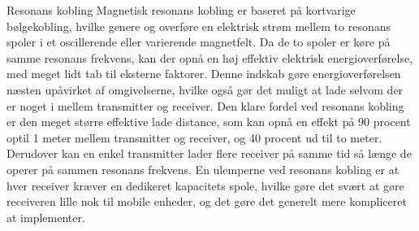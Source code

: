 Resonans kobling 
Magnetisk resonans kobling er baseret på kortvarige bølgekobling, hvilke genere og overføre en elektrisk strøm mellem to resonans spoler i et oscillerende eller varierende magnetfelt. Da de to spoler er køre på samme resonans frekvens, kan der opnå en høj effektiv elektrisk energioverførelse, med meget lidt tab til  eksterne faktorer. Denne indskab gøre energioverførelsen næsten upåvirket af omgivelserne, hvilke også gør det muligt at lade selvom der er noget i mellem transmitter og receiver. 
Den klare fordel ved resonans kobling er den meget større effektive lade distance, som kan opnå en effekt på 90 procent optil 1 meter mellem transmitter og receiver, og 40 procent ud til to meter. Derudover kan en enkel transmitter lader flere receiver på samme tid så længe de operer på sammen resonans frekvens.
En ulemperne ved resonans kobling er at hver receiver kræver en dedikeret kapacitets spole, hvilke gøre det svært at gøre receiveren lille nok til mobile enheder, og det gøre det generelt mere kompliceret at implementer. 